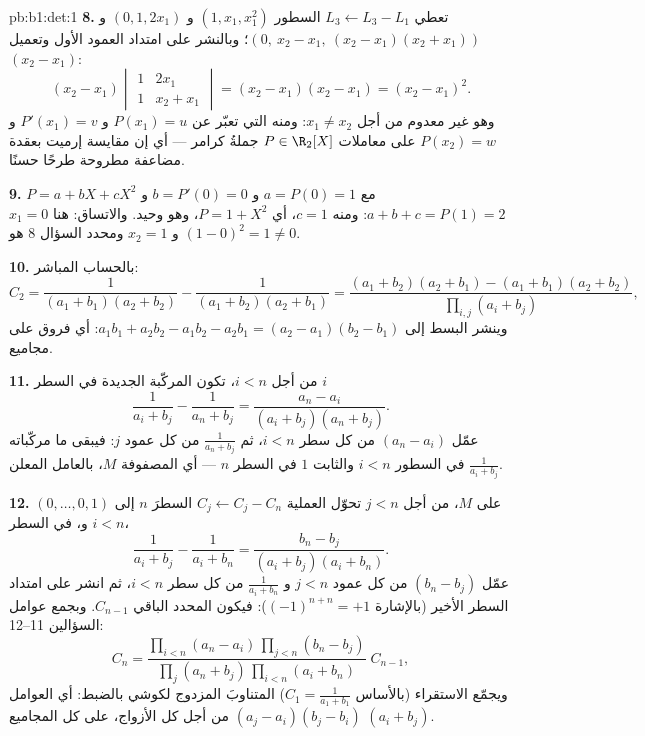 \begin{solution}{pb:b1:det:1}
\textbf{8.} تعطي $L_3 \leftarrow L_3 - L_1$ السطور $(1, x_1,
x_1^2)$ و $(0, 1, 2x_1)$ و $(0,\ x_2 - x_1,\ (x_2-x_1)(x_2+x_1))$؛
وبالنشر على امتداد العمود الأول وتعميل $(x_2 - x_1)$:
\[
(x_2 - x_1)\begin{vmatrix} 1 & 2x_1\\ 1 & x_2 + x_1
\end{vmatrix} = (x_2 - x_1)(x_2 - x_1) = (x_2 - x_1)^2 .
\]
وهو غير معدوم من أجل $x_1 \neq x_2$: ومنه  التي تعبّر عن
$P(x_1) = u$ و $P'(x_1) = v$ و $P(x_2) = w$ على معاملات
$P \in \R_2[X]$ جملةُ كرامر --- أي إن مقايسة إرميت بعقدة
مضاعفة مطروحة طرحًا حسنًا.

\textbf{9.} $P = a + bX + cX^2$ مع $a = P(0) = 1$ و $b = P'(0)
= 0$ و $a + b + c = P(1) = 2$: ومنه $c = 1$، أي $P = 1 + X^2$، وهو وحيد.
والاتساق: هنا $x_1 = 0$ و $x_2 = 1$ ومحدد
السؤال 8 هو $(1 - 0)^2 = 1 \neq 0$.

\textbf{10.} بالحساب المباشر:
\[
C_2 = \frac{1}{(a_1+b_1)(a_2+b_2)} - \frac{1}{(a_1+b_2)(a_2+b_1)}
= \frac{(a_1+b_2)(a_2+b_1) - (a_1+b_1)(a_2+b_2)}
{\prod_{i,j}(a_i+b_j)} ,
\]
وينشر البسط إلى $a_1b_1 + a_2b_2 - a_1b_2 - a_2b_1
= (a_2 - a_1)(b_2 - b_1)$: أي فروق على مجاميع.

\textbf{11.} من أجل $i < n$، تكون المركّبة الجديدة في السطر $i$
\[
\frac{1}{a_i + b_j} - \frac{1}{a_n + b_j}
= \frac{a_n - a_i}{(a_i + b_j)(a_n + b_j)} .
\]
عمّل $(a_n - a_i)$ من كل سطر $i < n$، ثم
$\frac1{a_n + b_j}$ من كل عمود $j$: فيبقى ما مركّباته
$\frac1{a_i + b_j}$ في السطور $i < n$ والثابت $1$ في
السطر $n$ --- أي المصفوفة $M$، بالعامل المعلن.

\textbf{12.} على $M$، من أجل $j < n$ تحوّل العملية $C_j \leftarrow
C_j - C_n$ السطرَ $n$ إلى $(0, \dots, 0, 1)$ و، في السطر $i
< n$،
\[
\frac{1}{a_i + b_j} - \frac{1}{a_i + b_n}
= \frac{b_n - b_j}{(a_i + b_j)(a_i + b_n)} .
\]
عمّل $(b_n - b_j)$ من كل عمود $j < n$ و $\frac1{a_i +
b_n}$ من كل سطر $i < n$، ثم انشر على امتداد السطر الأخير
(بالإشارة $(-1)^{n+n} = +1$): فيكون المحدد الباقي
$C_{n-1}$. وبجمع عوامل السؤالين 11--12:
\[
C_n = \frac{\prod_{i<n}(a_n - a_i)\,\prod_{j<n}(b_n - b_j)}
{\prod_{j}(a_n + b_j)\,\prod_{i<n}(a_i + b_n)}\;C_{n-1},
\]
ويجمّع الاستقراء (بالأساس $C_1 = \frac1{a_1+b_1}$)
المتناوبَ المزدوج لكوشي بالضبط: أي العوامل $(a_j - a_i)(b_j
- b_i)$ من أجل كل الأزواج، على كل المجاميع $(a_i + b_j)$.


\end{solution}
